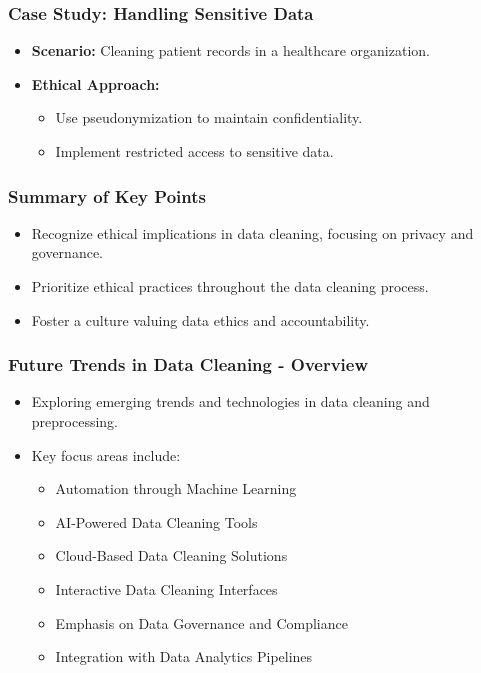 \documentclass[aspectratio=169]{beamer}
\begin{document}
\begin{frame}[fragile]
    \frametitle{Case Study: Handling Sensitive Data}
    \begin{itemize}
        \item \textbf{Scenario:} Cleaning patient records in a healthcare organization.
        \item \textbf{Ethical Approach:}
        \begin{itemize}
            \item Use pseudonymization to maintain confidentiality.
            \item Implement restricted access to sensitive data.
        \end{itemize}
    \end{itemize}
\end{frame}

\begin{frame}[fragile]
    \frametitle{Summary of Key Points}
    \begin{itemize}
        \item Recognize ethical implications in data cleaning, focusing on privacy and governance.
        \item Prioritize ethical practices throughout the data cleaning process.
        \item Foster a culture valuing data ethics and accountability.
    \end{itemize}
\end{frame}

\begin{frame}[fragile]
  \frametitle{Future Trends in Data Cleaning - Overview}
  \begin{itemize}
    \item Exploring emerging trends and technologies in data cleaning and preprocessing.
    \item Key focus areas include:
    \begin{itemize}
      \item Automation through Machine Learning
      \item AI-Powered Data Cleaning Tools
      \item Cloud-Based Data Cleaning Solutions
      \item Interactive Data Cleaning Interfaces
      \item Emphasis on Data Governance and Compliance
      \item Integration with Data Analytics Pipelines
    \end{itemize}
  \end{itemize}
\end{frame}
\end{document}
